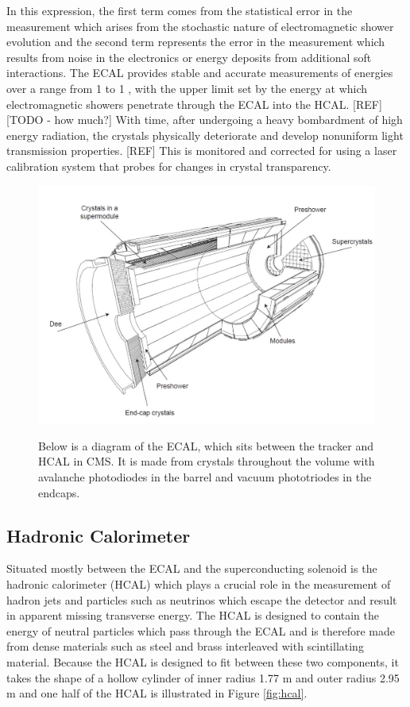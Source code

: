 In this expression, the first term comes from the statistical error 
 in the measurement which arises
 from the stochastic nature of electromagnetic shower evolution
 and the second term represents the error in the measurement
 which results from noise in the electronics or
 energy deposits from additional soft interactions.
The ECAL provides stable and accurate
 measurements of energies over a range from 1 \GeV to 1 \TeV, 
 with the upper limit set by the energy at which electromagnetic showers
 penetrate through the ECAL into the HCAL.
[REF][TODO - how much?]
With time, after undergoing a heavy bombardment of high energy radiation,
 the \pbw crystals physically deteriorate and develop 
 nonuniform light transmission properties.
[REF] 
This is monitored and corrected for using a laser calibration system
 that probes for changes in crystal transparency.

\begin{figure}[tb]
\caption[The CMS Electromagnetic Calorimeter]{
 Below is a diagram of the ECAL, 
  which sits between the tracker and HCAL in CMS.
 It is made from \pbw crystals throughout the volume
  with avalanche photodiodes in the barrel
  and vacuum phototriodes in the endcaps.
 }
\includegraphics[width=\textwidth]{pdfs/experiment/cms_ecal.pdf}
\label{fig:ecal}
\end{figure}
 

 \subsection{Hadronic Calorimeter}
Situated mostly between the ECAL and the superconducting solenoid
 is the hadronic calorimeter (HCAL) which plays a
 crucial role in the measurement of hadron jets
 and particles such as neutrinos which escape the detector
 and result in apparent missing transverse energy.
The HCAL is designed to contain the energy of neutral
 particles which pass through the ECAL and is therefore made
 from dense materials such as 
 steel and brass interleaved with scintillating material.
Because the HCAL is designed to fit between these
 two components, it takes the shape of a hollow
 cylinder of inner radius 1.77 m and outer radius 2.95 m
 and one half of the HCAL is illustrated in Figure \ref{fig:hcal}.

